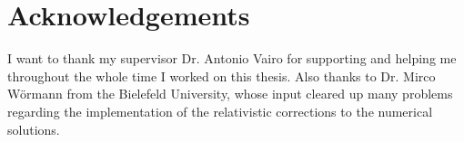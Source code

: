 \chapter*{Acknowledgements}
I want to thank my supervisor Dr. Antonio Vairo for supporting and helping me throughout the whole time I worked on this thesis. \newline \indent
Also thanks to Dr. Mirco Wörmann from the Bielefeld University, whose input cleared up many problems regarding the implementation of the relativistic corrections to the numerical solutions. 

